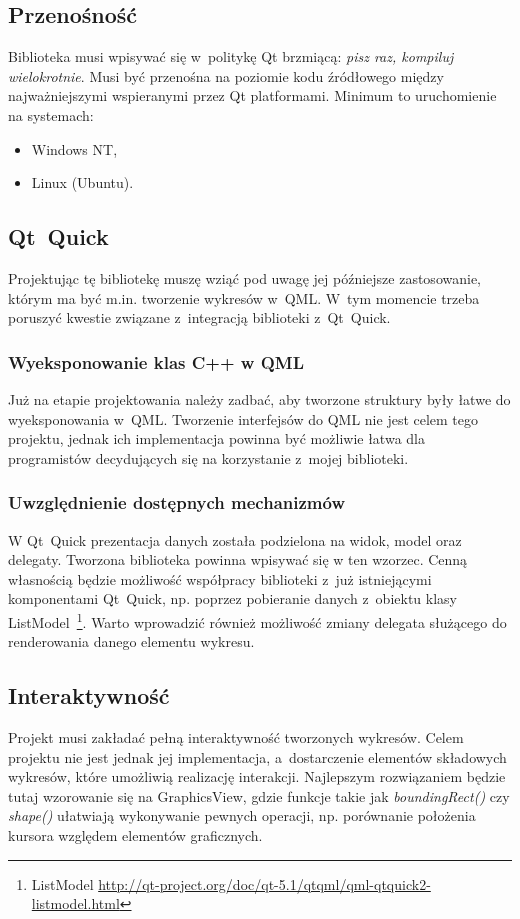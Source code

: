 \subsection{Przenośność}
Biblioteka musi wpisywać się w~politykę Qt brzmiącą: \textit{pisz raz, kompiluj wielokrotnie}. Musi być przenośna na poziomie kodu źródłowego między najważniejszymi wspieranymi przez Qt platformami.
Minimum to uruchomienie na systemach:
\begin{itemize}
\item{Windows NT,}
\item{Linux (Ubuntu).}
\end{itemize}



\subsection{Qt~Quick}
Projektując tę bibliotekę muszę wziąć pod uwagę jej późniejsze zastosowanie, którym ma być m.in. tworzenie wykresów w~QML. W~tym momencie trzeba poruszyć kwestie związane z~integracją biblioteki z~Qt~Quick.
\subsubsection{Wyeksponowanie klas C++ w QML}
Już na etapie projektowania należy zadbać, aby tworzone struktury były łatwe do wyeksponowania w~QML. 
Tworzenie interfejsów do QML nie jest celem tego projektu, jednak ich implementacja powinna być możliwie łatwa dla programistów decydujących się na korzystanie z~mojej biblioteki.

\subsubsection{Uwzględnienie dostępnych mechanizmów}
W Qt~Quick prezentacja danych została podzielona na widok, model oraz delegaty. Tworzona biblioteka powinna wpisywać się w ten wzorzec. Cenną własnością będzie możliwość współpracy biblioteki z~już istniejącymi komponentami Qt~Quick, np. poprzez pobieranie danych z~obiektu klasy ListModel~\footnote{ListModel \url{http://qt-project.org/doc/qt-5.1/qtqml/qml-qtquick2-listmodel.html}}. Warto wprowadzić również możliwość zmiany delegata służącego do renderowania danego elementu wykresu.

\subsection{Interaktywność}
Projekt musi zakładać pełną interaktywność tworzonych wykresów. Celem projektu nie jest jednak jej implementacja, a~dostarczenie elementów składowych wykresów, które umożliwią realizację interakcji. Najlepszym rozwiązaniem będzie tutaj wzorowanie się na GraphicsView, gdzie funkcje takie jak \textit{boundingRect()} czy \textit{shape()} ułatwiają wykonywanie pewnych operacji, np. porównanie położenia kursora względem elementów graficznych.


